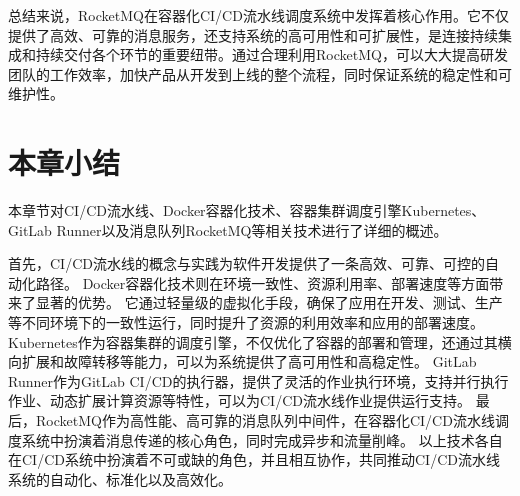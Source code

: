 总结来说，RocketMQ在容器化CI/CD流水线调度系统中发挥着核心作用。它不仅提供了高效、可靠的消息服务，还支持系统的高可用性和可扩展性，是连接持续集成和持续交付各个环节的重要纽带。通过合理利用RocketMQ，可以大大提高研发团队的工作效率，加快产品从开发到上线的整个流程，同时保证系统的稳定性和可维护性。

\section{本章小结}

本章节对CI/CD流水线、Docker容器化技术、容器集群调度引擎Kubernetes、GitLab Runner以及消息队列RocketMQ等相关技术进行了详细的概述。

首先，CI/CD流水线的概念与实践为软件开发提供了一条高效、可靠、可控的自动化路径。
Docker容器化技术则在环境一致性、资源利用率、部署速度等方面带来了显著的优势。
它通过轻量级的虚拟化手段，确保了应用在开发、测试、生产等不同环境下的一致性运行，同时提升了资源的利用效率和应用的部署速度。
Kubernetes作为容器集群的调度引擎，不仅优化了容器的部署和管理，还通过其横向扩展和故障转移等能力，可以为系统提供了高可用性和高稳定性。
GitLab Runner作为GitLab CI/CD的执行器，提供了灵活的作业执行环境，支持并行执行作业、动态扩展计算资源等特性，可以为CI/CD流水线作业提供运行支持。
最后，RocketMQ作为高性能、高可靠的消息队列中间件，在容器化CI/CD流水线调度系统中扮演着消息传递的核心角色，同时完成异步和流量削峰。
以上技术各自在CI/CD系统中扮演着不可或缺的角色，并且相互协作，共同推动CI/CD流水线系统的自动化、标准化以及高效化。